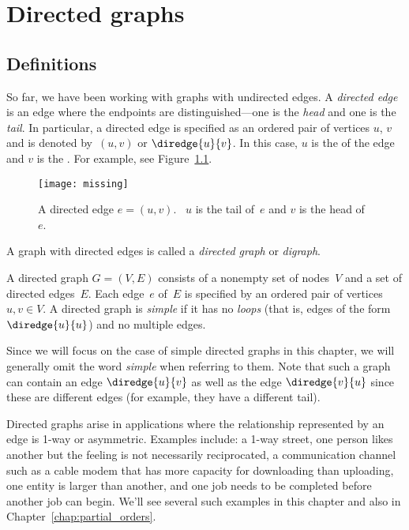 \chapter{Directed graphs}\label{chap:digraphs}

\section{Definitions}

So far, we have been working with graphs with undirected edges.  A
\emph{directed edge} is an edge where the endpoints are
distinguished---one is the \emph{head} and one is the \emph{tail}.  In
particular, a directed edge is specified as an ordered pair of
vertices $u$, $v$ and is denoted by~$(u, v)$ or $\diredge{u}{v}$.  In this
case, $u$ is the  of the edge and $v$ is the .
For example, see Figure~\ref{fig:6EA}.

\begin{figure}


\texttt{[image: missing]}

\caption{A directed edge $e = (u, v)$.  \ $u$ is the tail of~$e$ and
  $v$ is the head of~$e$.}

\label{fig:6EA}
\end{figure}

A graph with directed edges is called a \emph{directed graph} or
\emph{digraph}.

\begin{definition}\label{def:digraph}
A directed graph $G = (V, E)$ consists of a nonempty set of nodes~$V$
and a set of directed edges~$E$.  Each edge~$e$ of~$E$ is specified by
an ordered pair of vertices $u, v \in V$.  A directed graph
is \emph{simple} if it has no \emph{loops} (that is, edges of the form
$\diredge{u}{u}$) and no multiple edges.
\end{definition}

Since we will focus on the case of simple directed graphs in this
chapter, we will generally omit the word \emph{simple} when referring
to them.  Note that such a graph can contain an edge $\diredge{u}{v}$
as well as the edge $\diredge{v}{u}$ since these are different edges
(for example, they have a different tail).

Directed graphs arise in applications where the relationship
represented by an edge is 1-way or asymmetric.  Examples include: a
1-way street, one person likes another but the feeling is not
necessarily reciprocated, a communication channel such as a cable
modem that has more capacity for downloading than uploading, one
entity is larger than another, and one job needs to be completed
before another job can begin. We'll see several such examples in this
chapter and also in Chapter~\ref{chap:partial_orders}.

